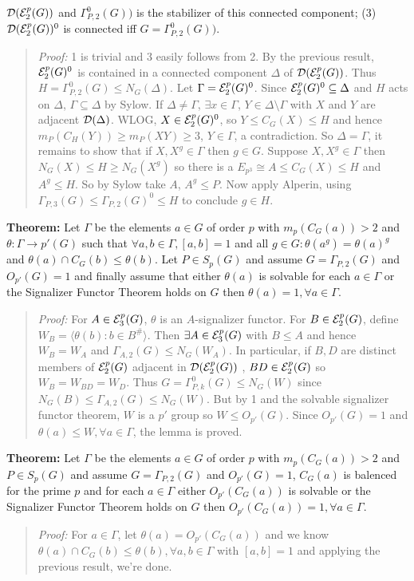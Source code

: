 ${\cal D}({\cal E}_2^p(G))$ and
$\Gamma_{P,2}^0(G))$ is the stabilizer of this connected component;
(3)
${\cal D}({\cal E}_2^p(G))^0$ is connected iff
$G= \Gamma_{P,2}^0(G))$.
\begin{quote}
\emph{Proof:}  
1 is trivial and 3 easily follows from 2.   By the previous result,
${\cal E}^p_2(G)^0$ is contained in a connected component $\Delta$ of
${\cal D}({\cal E}^p_2(G))$.  Thus
$H=
\Gamma_{P, 2}^0(G) \le N_G( \Delta )$.
Let $\Gamma= {\cal E}^p_2(G)^0$.
Since ${\cal E}^p_2(G)^0 \subseteq \Delta$ and $H$ acts on $\Delta$,
$\Gamma \subseteq \Delta$ by Sylow.  If $\Delta \ne \Gamma$, $\exists x \in \Gamma$,
$Y \in \Delta \setminus \Gamma$ with $X$ and $Y$ are adjacent
${\cal D}( \Delta )$.   WLOG,
$X \in {\cal E}^p_2(G)^0$, so $Y \le C_G(X) \le H$ and hence
$m_P(C_H(Y)) \ge m_P(XY) \ge 3$, $Y \in \Gamma$, a contradiction.
So $\Delta = \Gamma$, it remains to show that if 
$X, X^g \in \Gamma$ then $g \in G$.
Suppose
$X, X^g \in \Gamma$ then $N_G(X) \le H \ge N_G(X^g )$ so there is a
$E_{p^3} \cong A \le C_G(X) \le H$ and $A^g \le H$.  So by Sylow take $A$,
$A^g \le P$.  Now apply Alperin, using 
$ \Gamma_{P, 3}(G) \le \Gamma_{P, 2}(G)^0 \le H $ to conclude $g \in H$.
\end{quote}
{\bf Theorem:} 
Let $\Gamma$ be the elements $a \in G$ of order $p$ with $m_p(C_G(a)) > 2$ and
$\theta: \Gamma \rightarrow p'(G)$ such that $\forall a,b \in \Gamma, [a,b]=1$ and
all $g \in G: \theta(a^g)=\theta(a)^g$ and $\theta(a) \cap C_G(b) \le \theta(b)$.
Let $P \in S_p(G)$ and assume $G=\Gamma_{P,2}(G)$ and $O_{p'}(G)=1$ and finally assume
that either $\theta(a)$ is solvable for each $a \in \Gamma$ or the Signalizer Functor Theorem
holds on $G$ then $\theta(a)=1, \forall a \in \Gamma$.
\begin{quote}
\emph{Proof:}  
For $A \in {\cal E}^p_3(G)$, $\theta$ is an $A$-signalizer functor.  For
$B \in {\cal E}^p_2(G)$, define $W_B= \langle \theta(b): b \in B^{\#} \rangle$.  Then
$\exists A \in {\cal E}^p_3(G)$ with $B \le A$ and hence $W_B = W_A$ and
$\Gamma_{A,2}(G) \le N_G(W_A)$.  In particular, if $B, D$ are distinct members of
${\cal E}^p_2(G)$ adjacent in
${\cal D}({\cal E}^p_2(G))$ , $BD \in
{\cal E}^p_2(G)$ so $W_B = W_{BD} = W_D$.  Thus
$G = \Gamma^0_{P, k}(G) \le N_G(W)$ since
$N_G(B) \le \Gamma_{A,2}(G) \le N_G(W)$.  But by 1 and the solvable signalizer functor theorem,
$W$ is a $p'$ group so $W \le O_{p'}(G)$.  
Since $O_{p'}(G) = 1$ and $\theta(a) \le W, \forall a \in \Gamma$, the lemma is proved.
\end{quote}
{\bf Theorem:} 
Let $\Gamma$ be the elements $a \in G$ of order $p$ with $m_p(C_G(a)) > 2$ and
$P \in S_p(G)$ and assume $G=\Gamma_{P,2}(G)$ and $O_{p'}(G)=1$, $C_G(a)$ is balenced
for the prime $p$ and for each $a \in \Gamma$ either
$O_{p'}(C_G(a))$ is solvable or the Signalizer Functor Theorem holds on $G$ then
$O_{p'}(C_G(a))=1, \forall a \in \Gamma$.
\begin{quote}
\emph{Proof:}  
For $a \in \Gamma$, let $\theta(a)= O_{p'}(C_G(a))$ and we know
$\theta(a) \cap C_G(b) \le \theta(b), \forall a, b \in \Gamma$ with $[a,b]= 1$ and applying the
previous result, we're done.
\end{quote}
